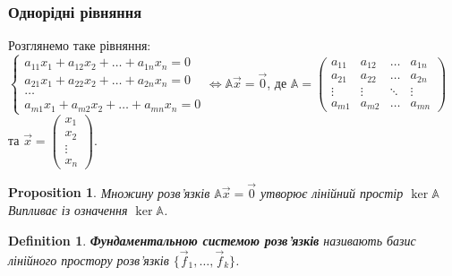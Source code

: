 \documentclass[a4paper, 10pt]{article}
\theoremstyle{theoremdd}
\newtheorem{definition}[theorem]{Definition}
\newtheorem{proposition}[theorem]{Proposition}
\begin{document}
\subsubsection*{Однорідні рівняння}
Розглянемо таке рівняння:\\
$\begin{cases}
a_{11}x_1 + a_{12}x_2 + \dots + a_{1n}x_n = 0\\
a_{21}x_1 + a_{22}x_2 + \dots + a_{2n}x_n = 0\\
\dots \\
a_{m1}x_1 + a_{m2}x_2 + \dots + a_{mn}x_n = 0
\end{cases} \iff \mathbb{A} \vec{x} = \vec{0}
$,
де $\mathbb{A} = \begin{pmatrix}
a_{11} & a_{12} & \dots & a_{1n} \\
a_{21} & a_{22} & \dots & a_{2n} \\
\vdots & \vdots & \ddots & \vdots \\
a_{m1} & a_{m2} & \dots & a_{mn}
\end{pmatrix}$ та $\vec{x} = \begin{pmatrix}
x_1 \\ x_2 \\ \vdots \\ x_n
\end{pmatrix}$.

\begin{proposition}
Множину розв'язків $\mathbb{A} \vec{x} = \vec{0}$ утворює лінійний простір $\ker { \mathbb{A}}$\\
\textit{Випливає із означення $\ker { \mathbb{A}}$.}
\end{proposition}

\begin{definition}
\textbf{Фундаментальною системою розв'язків} називають базис лінійного простору розв'язків $\{\vec{f}_1,\dots,\vec{f}_k\}$.
\end{definition}
\end{document}
